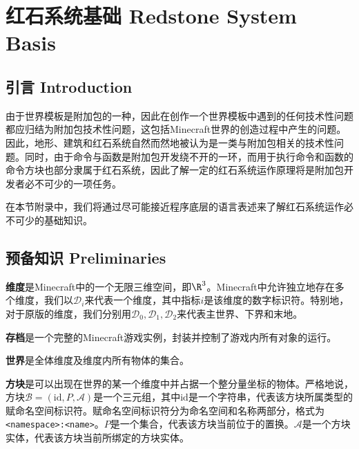 \documentclass[a4,11pt]{aleph-notas}
\begin{document}
\encabezado

\appendix

\vspace*{-8mm}
\section{红石系统基础 Redstone System Basis}

\subsection{引言 Introduction}

由于世界模板是附加包的一种，因此在创作一个世界模板中遇到的任何技术性问题都应归结为附加包技术性问题，这包括Minecraft世界的创造过程中产生的问题。因此，地形、建筑和红石系统自然而然地被认为是一类与附加包相关的技术性问题。同时，由于命令与函数是附加包开发绕不开的一环，而用于执行命令和函数的命令方块也部分隶属于红石系统，因此了解一定的红石系统运作原理将是附加包开发者必不可少的一项任务。

在本节附录中，我们将通过尽可能接近程序底层的语言表述来了解红石系统运作必不可少的基础知识。

\subsection{预备知识 Preliminaries}

\begin{defi}[维度 dimension]
    \textbf{维度}是Minecraft中的一个无限三维空间，即$\R^3$。Minecraft中允许独立地存在多个维度，我们以$\mathcal{D}_i$来代表一个维度，其中指标$i$是该维度的数字标识符。特别地，对于原版的维度，我们分别用$\mathcal{D}_0,\mathcal{D}_1,\mathcal{D}_2$来代表主世界、下界和末地。
\end{defi}

\begin{defi}[存档 level]
    \textbf{存档}是一个完整的Minecraft游戏实例，封装并控制了游戏内所有对象的运行。
\end{defi}

\begin{defi}[世界 world]
    \textbf{世界}是全体维度及维度内所有物体的集合。
\end{defi}

\begin{defi}[方块 block]
    \textbf{方块}是可以出现在世界的某一个维度中并占据一个整分量坐标的物体。严格地说，方块$\mathcal{B}=(\mathrm{id},P,\mathcal{A})$是一个三元组，其中$\mathrm{id}$是一个字符串，代表该方块所属类型的赋命名空间标识符。赋命名空间标识符分为命名空间和名称两部分，格式为\texttt{<namespace>:<name>}。$P$是一个集合，代表该方块当前位于的置换。$\mathcal{A}$是一个方块实体，代表该方块当前所绑定的方块实体。
\end{defi}
\end{document}
